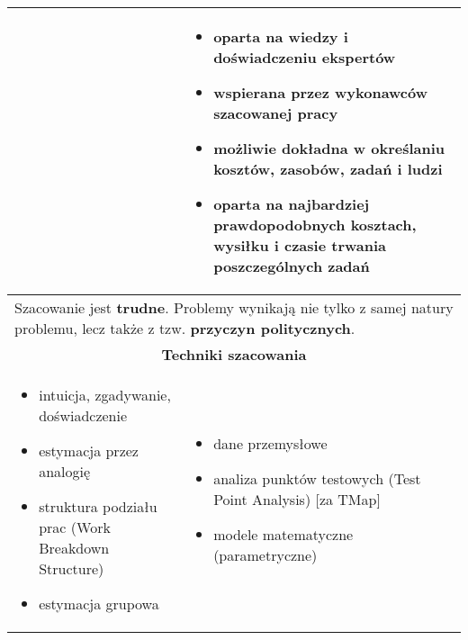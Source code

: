 \documentclass[../main.tex]{subfiles}
\begin{document}
\begin{table}[H]
\begin{center}
\begin{tabular}{| p{8cm} | p{8cm} |}
                &
                \begin{itemize}
                    \item oparta na wiedzy i doświadczeniu ekspertów
                    \item wspierana przez wykonawców szacowanej pracy
                    \item możliwie dokładna w określaniu kosztów, zasobów, zadań i ludzi
                    \item oparta na najbardziej prawdopodobnych kosztach, wysiłku i czasie trwania poszczególnych zadań
                \end{itemize}
                \\
                \hline
                \multicolumn{2}{|p{16cm}|}{Szacowanie jest \textbf{trudne}. Problemy wynikają nie tylko z samej natury problemu, lecz także z tzw. \textbf{przyczyn politycznych}.
                } \\
                \hline
                \hline
                \multicolumn{2}{|c|}{\textbf{Techniki szacowania}} \\
                \hline
                \begin{itemize}
                    \item intuicja, zgadywanie, doświadczenie
                    \item estymacja przez analogię
                    \item struktura podziału prac (Work Breakdown Structure)
                    \item estymacja grupowa
                \end{itemize}
                &
                \begin{itemize}
                    \item dane przemysłowe
                    \item analiza punktów testowych (Test Point Analysis) [za TMap]
                    \item modele matematyczne (parametryczne)
                \end{itemize} \\
                \hline
            \end{tabular}
        \end{center}
    \end{table}
\end{document}
